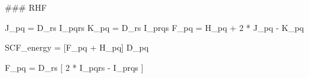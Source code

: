 ### RHF

J_{pq} = D_{rs} I_{pqrs}
K_{pq} = D_{rs} I_{prqs}
F_{pq} = H_{pq} + 2 * J_{pq} - K_{pq}

SCF_{energy} = [F_{pq} + H_{pq}] D_{pq}

F_{pq} = D_{rs} [ 2 * I_{pqrs} - I_{prqs} ]



